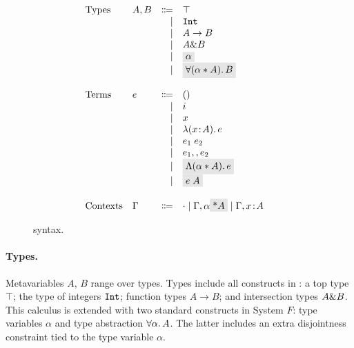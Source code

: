 \begin{figure}
  \[
    \begin{array}{l}
      \begin{array}{llrll}
        \text{Types}
        & A, B & \Coloneqq & \top                        & \\
        &      & \mid & \tyint                           & \\
        &      & \mid & A \to B                          & \\
        &      & \mid & A \inter B                       & \\
        &      & \mid & \highlight{$\alpha$}             & \\
        &      & \mid & \highlight{$\fordis \alpha A B$} & \\

        \\
        \text{Terms}
        & e & \Coloneqq & ()                           & \\
        &   & \mid & i                                 & \\
        &   & \mid & x                                 & \\
        &   & \mid & \lamty x A e                      & \\
        &   & \mid & \app {e_1} {e_2}                  & \\
        &   & \mid & e_1 \mergeop e_2                  & \\
        &   & \mid & \highlight{$\blamdis \alpha A e$} & \\
        &   & \mid & \highlight{$\tapp e A$}           & \\

        \\
        \text{Contexts}
        & \Gamma & \Coloneqq & \cdot
                   \mid \Gamma, \alpha \highlight{\disjoint $A$}
                   \mid \Gamma, x \oftype A  & \\
      \end{array}
    \end{array}
  \]

  \caption{\name syntax.}
  \label{fig:fi-syntax}
\end{figure}

\paragraph{Types.} 
Metavariables $A$, $B$ range over types. 
Types include all constructs in \name: a top type $\top$; 
the type of integers $\texttt{Int}$;
function types $A \to B$; and intersection types $A \& B$.
This calculus is extended with two standard constructs in System $F$: 
type variables $\alpha$ and type abstraction $\forall \alpha.\, A$. 
The latter includes an extra disjointness constraint tied to the type 
variable $\alpha$.

